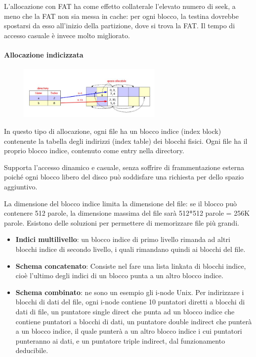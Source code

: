\documentclass[a4paper]{article}
\begin{document}
L'allocazione con FAT ha come effetto collaterale l'elevato numero di seek, a meno che la FAT non sia messa in cache: per ogni blocco, la testina dovrebbe spostarsi da esso all'inizio della partizione, dove si trova la FAT. Il tempo di accesso casuale è invece molto migliorato.

\paragraph{Allocazione indicizzata}
\begin{figure}
   \centering
   \includegraphics[width=7cm]{img/allocind.JPG}
\end{figure}
In questo tipo di allocazione, ogni file ha un blocco indice (index block) contenente la tabella degli indirizzi (index table) dei blocchi fisici. Ogni file ha il proprio blocco indice, contenuto come entry nella directory.

Supporta l'accesso dinamico e casuale, senza soffrire di frammentazione esterna poiché ogni blocco libero del disco può soddisfare una richiesta per dello spazio aggiuntivo.

La dimensione del blocco indice limita la dimensione del file: se il blocco può contenere 512 parole, la dimensione massima del file sarà 512*512 parole = 256K parole. Esistono delle soluzioni per permettere di memorizzare file più grandi.
\begin{itemize}
   \item \textbf{Indici multilivello}: un blocco indice di primo livello rimanda ad altri blocchi indice di secondo livello, i quali rimandano quindi ai blocchi del file.
   \item \textbf{Schema concatenato}: Consiste nel fare una lista linkata di blocchi indice, cioè l'ultimo degli indici di un blocco punta a un altro blocco indice.
   \item \textbf{Schema combinato}: ne sono un esempio gli i-node Unix. Per indirizzare i blocchi di dati del file, ogni i-node contiene 10 puntatori diretti a blocchi di dati di file, un puntatore single direct che punta ad un blocco indice che contiene puntatori a blocchi di dati, un puntatore double indirect che punterà a un blocco indice, il quale punterà a un altro blocco indice i cui puntatori punteranno ai dati, e un puntatore triple indirect, dal funzionamento deducibile.
\end{itemize}
\end{document}

